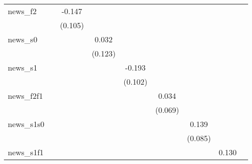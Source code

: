{\begin{tabular}{l*{8}{c}}
news\_f2     &                     &      -0.147         &                     &                     &                     &                     &                     &                     \\
            &                     &     (0.105)         &                     &                     &                     &                     &                     &                     \\
\addlinespace
news\_s0     &                     &                     &       0.032         &                     &                     &                     &                     &                     \\
            &                     &                     &     (0.123)         &                     &                     &                     &                     &                     \\
\addlinespace
news\_s1     &                     &                     &                     &      -0.193\sym{*}  &                     &                     &                     &                     \\
            &                     &                     &                     &     (0.102)         &                     &                     &                     &                     \\
\addlinespace
news\_f2f1   &                     &                     &                     &                     &       0.034         &                     &                     &                     \\
            &                     &                     &                     &                     &     (0.069)         &                     &                     &                     \\
\addlinespace
news\_s1s0   &                     &                     &                     &                     &                     &       0.139         &                     &                     \\
            &                     &                     &                     &                     &                     &     (0.085)         &                     &                     \\
\addlinespace
news\_s1f1   &                     &                     &                     &                     &                     &                     &       0.130         &                     \\

\end{tabular}}
